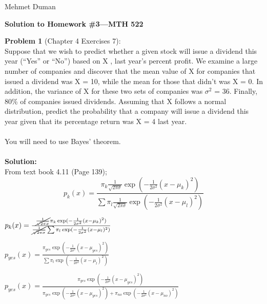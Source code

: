 \documentclass{article}
\begin{document}
\begin{flushright}
	Mehmet Duman
\end{flushright}

\begin{center}
{\Large {\bf Solution to Homework \#3---MTH 522} }
\end{center}

{\bf Problem 1} (Chapter 4 Exercises 7):\\
Suppose that we wish to predict whether a given stock will issue a dividend this year (“Yes” or “No”) based on X , last year’s percent profit. We examine a large number of companies and discover that the mean value of X for companies that issued a dividend was X = 10, while the mean for those that didn’t was X = 0. In addition, the variance of X for these two sets of companies was $\sigma^2$ = 36. Finally, 80\% of companies issued dividends. Assuming that X follows a normal distribution, predict the probability that a company will issue a dividend this year given that its percentage return was X = 4 last year.
\\
\\
You will need to use Bayes’ theorem.
\\
\\
{\bf Solution:}
\\
From text book 4.11 (Page 139);
\begin{equation}
p_k(x) = \frac{ \pi_k \frac{1} {\sqrt{2\pi \sigma} }  \exp(- \frac{1}{2 \sigma^2} (x -\mu_k )^2 ) } 
                { \sum \pi_l  \frac{1} {\sqrt{2\pi \sigma} }  \exp(- \frac{1}{2 \sigma^2} (x -\mu_l )^2 ) }                 
\end{equation}

\begin{center}
$p_k(x) = \frac{ \cancel{  \frac{1} {\sqrt{2\pi \sigma} } }   \pi_k   \exp(- \frac{1}{2 \sigma^2} (x -\mu_k )^2 ) } 
                      { \cancel{  \frac{1} {\sqrt{2\pi \sigma} } }  \sum \pi_l    \exp(- \frac{1}{2 \sigma^2} (x -\mu_l )^2 ) }  $      
\end{center}

\begin{center}
$p_{yes}(x) = \frac{   \pi_{yes}   \exp(- \frac{1}{2 \sigma^2} (x -\mu_{yes})^2 ) } 
{  \sum \pi_l    \exp(- \frac{1}{2 \sigma^2} (x -\mu_l )^2 ) }  $      
\end{center}

\begin{center}
$p_{yes}(x) = \frac{  \pi_{yes}   \exp(- \frac{1}{2 \sigma^2} (x -\mu_{yes})^2 ) } 
                             { \pi_{yes}    \exp(- \frac{1}{2 \sigma^2} (x -\mu_{yes} )^2)  +  
                               \pi_{no}    \exp(- \frac{1}{2 \sigma^2} (x -\mu_{no} )^2) }  $      
\end{center}
\end{document}
